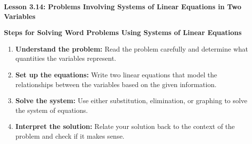  \begin{center}
\textbf{Lesson 3.14: Problems Involving Systems of Linear Equations in Two Variables}
\end{center}

\vspace*{-1.5ex}

\noindent\textbf{Steps for Solving Word Problems Using Systems of Linear Equations}

\begin{enumerate}
    \item \textbf{Understand the problem:} Read the problem carefully and determine what quantities the variables represent.
    \item \textbf{Set up the equations:} Write two linear equations that model the relationships between the variables based on the given information.
    \item \textbf{Solve the system:} Use either substitution, elimination, or graphing to solve the system of equations.
    \item \textbf{Interpret the solution:} Relate your solution back to the context of the problem and check if it makes sense.
\end{enumerate}


